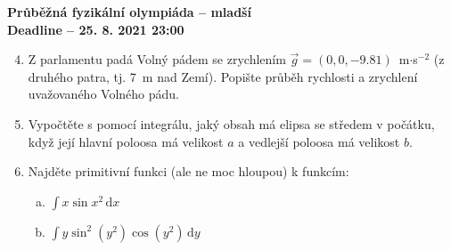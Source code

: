 \documentclass[a4paper, 12pt]{article}
\newcommand{\de}{\, \mathrm{d}}
\begin{document}
\begin{center}
\textbf{{\large
Průběžná fyzikální olympiáda -- mladší\\
Deadline -- 25. 8. 2021 23:00
}}

\end{center}


\begin{enumerate} [1)]
\setcounter{enumi}{3}
\item\relax[5 bodů] 
Z parlamentu padá Volný pádem se zrychlením $\Vec{g}=(0,0,-9.81)$~m$\cdot$s$^{-2}$ (z druhého patra, tj. 7~m nad Zemí). Popište průběh rychlosti a zrychlení uvažovaného Volného pádu. 
\item\relax[3 body] 

Vypočtěte s pomocí integrálu, jaký obsah má elipsa se středem v počátku, když její hlavní poloosa má velikost $a$ a vedlejší poloosa má velikost $b$.

\item\relax[3 body] 

Najděte primitivní funkci (ale ne moc hloupou) k funkcím:
\begin{enumerate}[a)]
    \item $\int x \sin x^2 \de x$
    \item $\int y \sin^2 (y^2) \cos(y^2) \de y$
\end{enumerate}

\end{enumerate}
\end{document}

